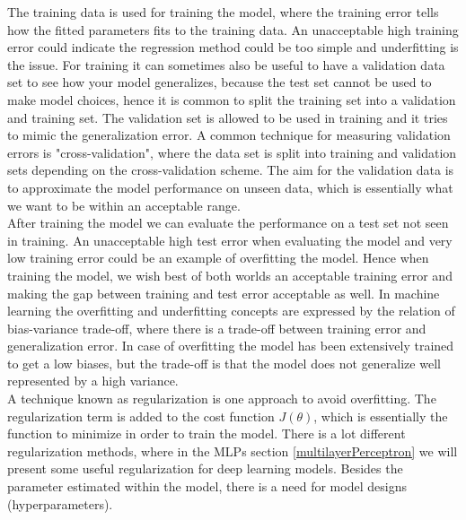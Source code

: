 The training data is used for training the model, where the training error tells how the fitted parameters fits to the training data. An unacceptable high training error could indicate the regression method could be too simple and underfitting is the issue. For training it can sometimes also be useful to have a validation data set to see how your model generalizes, because the test set cannot be used to make model choices, hence it is common to split the training set into a validation and training set. The validation set is allowed to be used in training and it tries to mimic the generalization error. A common technique for measuring validation errors is "cross-validation", where the data set is split into training and validation sets depending on the cross-validation scheme. The aim for the validation data is to approximate the model performance on unseen data, which is essentially what we want to be within an acceptable range.\\

After training the model we can evaluate the performance on a test set not seen in training. An unacceptable high test error when evaluating the model and very low training error could be an example of overfitting the model. Hence when training the model, we wish best of both worlds an acceptable training error and making the gap between training and test error acceptable as well. In machine learning the overfitting and underfitting concepts are expressed by the relation of bias-variance trade-off, where there is a trade-off between training error and generalization error. In case of overfitting the model has been extensively trained to get a low biases, but the trade-off is that the model does not generalize well represented by a high variance.\\

A technique known as regularization is one approach to avoid overfitting. The regularization term is added to the cost function $J(\theta)$, which is essentially the function to minimize in order to train the model. There is a lot different regularization methods, where in the MLPs section \ref{multilayerPerceptron} we will present some useful regularization for deep learning models. Besides the parameter estimated within the model, there is a need for model designs (hyperparameters).\\

